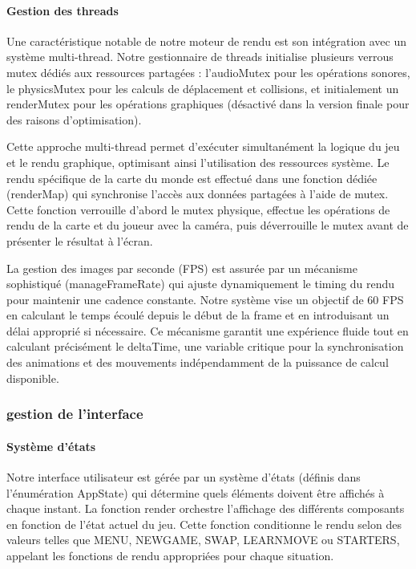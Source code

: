 \documentclass[12pt,a4paper, twoside]{article}
\begin{document}
\paragraph{Gestion des threads} Une caractéristique notable de notre moteur de rendu est son intégration avec un système multi-thread. Notre gestionnaire de threads initialise plusieurs verrous mutex dédiés aux ressources partagées : l'audioMutex pour les opérations sonores, le physicsMutex pour les calculs de déplacement et collisions, et initialement un renderMutex pour les opérations graphiques (désactivé dans la version finale pour des raisons d'optimisation).

Cette approche multi-thread permet d'exécuter simultanément la logique du jeu et le rendu graphique, optimisant ainsi l'utilisation des ressources système. Le rendu spécifique de la carte du monde est effectué dans une fonction dédiée (renderMap) qui synchronise l'accès aux données partagées à l'aide de mutex. Cette fonction verrouille d'abord le mutex physique, effectue les opérations de rendu de la carte et du joueur avec la caméra, puis déverrouille le mutex avant de présenter le résultat à l'écran.

La gestion des images par seconde (FPS) est assurée par un mécanisme sophistiqué (manageFrameRate) qui ajuste dynamiquement le timing du rendu pour maintenir une cadence constante. Notre système vise un objectif de 60 FPS en calculant le temps écoulé depuis le début de la frame et en introduisant un délai approprié si nécessaire. Ce mécanisme garantit une expérience fluide tout en calculant précisément le deltaTime, une variable critique pour la synchronisation des animations et des mouvements indépendamment de la puissance de calcul disponible.

\subsubsection{gestion de l'interface}
\paragraph{Système d'états} Notre interface utilisateur est gérée par un système d'états (définis dans l'énumération AppState) qui détermine quels éléments doivent être affichés à chaque instant. La fonction render orchestre l'affichage des différents composants en fonction de l'état actuel du jeu. Cette fonction conditionne le rendu selon des valeurs telles que MENU, NEWGAME, SWAP, LEARNMOVE ou STARTERS, appelant les fonctions de rendu appropriées pour chaque situation.
\end{document}
